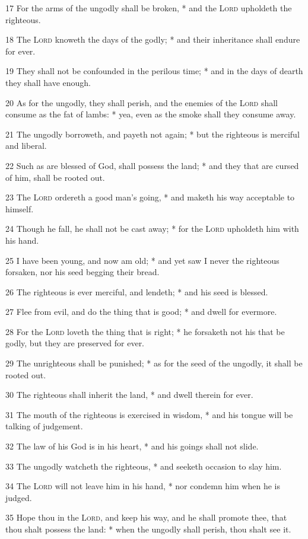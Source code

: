 17 For the arms of the ungodly shall be broken, * and the {\textsc{Lord}} upholdeth the righteous.\par
18 The {\textsc{Lord}} knoweth the days of the godly; * and their inheritance shall endure for ever.\par
19 They shall not be confounded in the perilous time; * and in the days of dearth they shall have enough.\par
20 As for the ungodly, they shall perish, and the enemies of the {\textsc{Lord}} shall consume as the fat of lambs: * yea, even as the smoke shall they consume away.\par
21 The ungodly borroweth, and payeth not again; * but the righteous is merciful and liberal.\par
22 Such as are blessed of God, shall possess the land; * and they that are cursed of him, shall be rooted out.\par
23 The {\textsc{Lord}} ordereth a good man's going, * and maketh his way acceptable to himself.\par
24 Though he fall, he shall not be cast away; * for the {\textsc{Lord}} upholdeth him with his hand.\par
25 I have been young, and now am old; * and yet saw I never the righteous forsaken, nor his seed begging their bread.\par
26 The righteous is ever merciful, and lendeth; * and his seed is blessed.\par
27 Flee from evil, and do the thing that is good; * and dwell for evermore.\par
28 For the {\textsc{Lord}} loveth the thing that is right; * he forsaketh not his that be godly, but they are preserved for ever.\par
29 The unrighteous shall be punished; * as for the seed of the ungodly, it shall be rooted out.\par
30 The righteous shall inherit the land, * and dwell therein for ever.\par
31 The mouth of the righteous is exercised in wisdom, * and his tongue will be talking of judgement.\par
32 The law of his God is in his heart, * and his goings shall not slide.\par
33 The ungodly watcheth the righteous, * and seeketh occasion to slay him.\par
34 The {\textsc{Lord}} will not leave him in his hand, * nor condemn him when he is judged.\par
35 Hope thou in the {\textsc{Lord}}, and keep his way, and he shall promote thee, that thou shalt possess the land: * when the ungodly shall perish, thou shalt see it.\par
